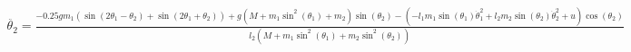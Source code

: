\documentclass[preview]{standalone}
\begin{document}
\begin{align*}
\ddot{\theta_2} = \frac{- 0.25 g m_{1} \left(\operatorname{sin}\left(2 \theta_{1} - \theta_{2}\right) + \operatorname{sin}\left(2 \theta_{1} + \theta_{2}\right)\right) + g \left(M + m_{1} \operatorname{sin}^{2}\left(\theta_{1}\right) + m_{2}\right) \operatorname{sin}\left(\theta_{2}\right) - \left(- l_{1} m_{1} \operatorname{sin}\left(\theta_{1}\right) \dot{\theta}_{1}^{2} + l_{2} m_{2} \operatorname{sin}\left(\theta_{2}\right) \dot{\theta}_{2}^{2} + u\right) \operatorname{cos}\left(\theta_{2}\right)}{l_{2} \left(M + m_{1} \operatorname{sin}^{2}\left(\theta_{1}\right) + m_{2} \operatorname{sin}^{2}\left(\theta_{2}\right)\right)}
\end{align*}
\end{document}
